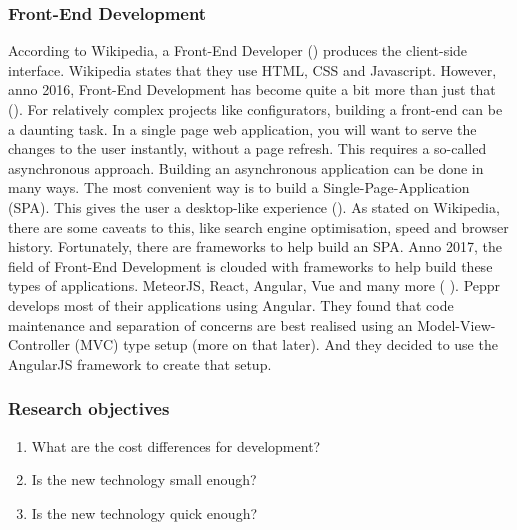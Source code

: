 \subsubsection{Front-End Development}
According to Wikipedia, a Front-End Developer (\cite{frontEndDevDefinition}) produces the client-side interface. Wikipedia states that they use HTML, CSS and Javascript. However, anno 2016, Front-End Development has become quite a bit more than just that (\cite{javascriptAnno2016}). For relatively complex projects like configurators, building a front-end can be a daunting task. In a single page web application, you will want to serve the changes to the user instantly, without a page refresh. This requires a so-called asynchronous approach. 
Building an asynchronous application can be done in many ways. The most convenient way is to build a Single-Page-Application (SPA). This gives the user a desktop-like experience (\cite{singlePageApplications}). As stated on Wikipedia, there are some caveats to this, like search engine optimisation, speed and browser history. Fortunately, there are frameworks to help build an SPA. Anno 2017, the field of Front-End Development is clouded with frameworks to help build these types of applications. MeteorJS, React, Angular, Vue and many more (\cite{frontEndJavascriptFrameworks} ).
Peppr develops most of their applications using Angular. They found that code maintenance and separation of concerns are best realised using an Model-View-Controller (MVC) type setup (more on that later). And they decided to use the AngularJS framework to create that setup.

\subsubsection{Research objectives}
\begin{enumerate}
	\item {What are the cost differences for development?}
	\item {Is the new technology small enough?}
	\item {Is the new technology quick enough?}
\end{enumerate}


